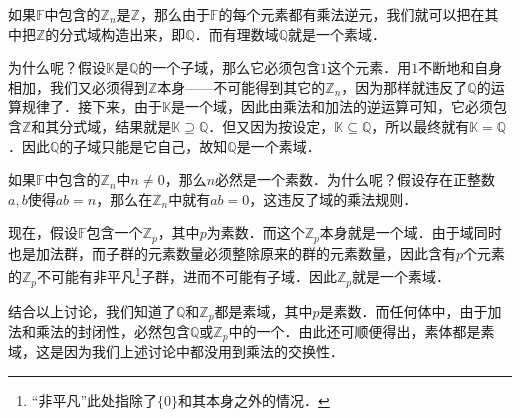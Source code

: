 如果$\mathbb{F}$中包含的$\mathbb{Z}_n$是$\mathbb{Z}$，那么由于$\mathbb{F}$的每个元素都有乘法逆元，我们就可以把在其中把$\mathbb{Z}$的分式域构造出来，即$\mathbb{Q}$．而有理数域$\mathbb{Q}$就是一个素域．

为什么呢？假设$\mathbb{K}$是$\mathbb{Q}$的一个子域，那么它必须包含$1$这个元素．用$1$不断地和自身相加，我们又必须得到$\mathbb{Z}$本身——不可能得到其它的$\mathbb{Z}_n$，因为那样就违反了$\mathbb{Q}$的运算规律了．接下来，由于$\mathbb{K}$是一个域，因此由乘法和加法的逆运算可知，它必须包含$\mathbb{Z}$和其分式域，结果就是$\mathbb{K}\supseteq\mathbb{Q}$．但又因为按设定，$\mathbb{K}\subseteq\mathbb{Q}$，所以最终就有$\mathbb{K}=\mathbb{Q}$．因此$\mathbb{Q}$的子域只能是它自己，故知$\mathbb{Q}$是一个素域．

如果$\mathbb{F}$中包含的$\mathbb{Z}_n$中$n\neq 0$，那么$n$必然是一个素数．为什么呢？假设存在正整数$a, b$使得$ab=n$，那么在$\mathbb{Z}_n$中就有$ab=0$，这违反了域的乘法规则．

现在，假设$\mathbb{F}$包含一个$\mathbb{Z}_p$，其中$p$为素数．而这个$\mathbb{Z}_p$本身就是一个域．由于域同时也是加法群，而子群的元素数量必须整除原来的群的元素数量，因此含有$p$个元素的$\mathbb{Z}_p$不可能有非平凡\footnote{“非平凡”此处指除了$\{0\}$和其本身之外的情况．}子群，进而不可能有子域．因此$\mathbb{Z}_p$就是一个素域．

结合以上讨论，我们知道了$\mathbb{Q}$和$\mathbb{Z}_p$都是素域，其中$p$是素数．而任何体中，由于加法和乘法的封闭性，必然包含$\mathbb{Q}$或$\mathbb{Z}_p$中的一个．由此还可顺便得出，素体都是素域，这是因为我们上述讨论中都没用到乘法的交换性．












